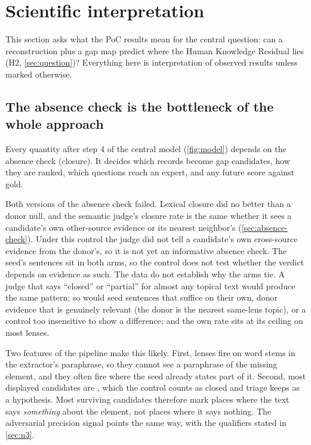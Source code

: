 \section{Scientific interpretation}\label{sec:interpretation}

This section asks what the PoC results mean for the central question: can a reconstruction plus a
gap map predict where the Human Knowledge Residual lies (H2, \cref{sec:question})? Everything here
is interpretation of observed results unless marked otherwise.

\subsection{The absence check is the bottleneck of the whole approach}\label{sec:interp-bottleneck}

Every quantity after step 4 of the central model (\cref{fig:model}) depends on the absence check
(closure). It decides which records become gap candidates, how they are ranked, which questions reach
an expert, and any future score against gold.

\evobs{} Both versions of the absence check failed. Lexical closure did no better than a donor null,
and the semantic judge's closure rate is the same whether it sees a candidate's own other-source
evidence or its nearest neighbor's (\cref{sec:absence-check}). Under this control the
judge did not tell a candidate's own cross-source evidence from the donor's, so it is not yet an
informative absence check. The seed's sentences sit in both arms, so the control does not test
whether the verdict depends on evidence as such. The data do not establish why the arms tie. A judge
that says \enquote{closed} or \enquote{partial} for almost any topical text would produce the same
pattern; so would seed sentences that suffice on their own, donor evidence that is genuinely relevant
(the donor is the nearest same-lens topic), or a control too insensitive to show a difference; and
the own rate sits at its ceiling on most lenses.

\evint{} Two features of the pipeline make this likely. First, lenses fire on word stems in the
extractor's paraphrase, so they cannot see a paraphrase of the missing element, and they often fire
where the seed already states part of it. Second, most displayed candidates are ,
which the control counts as closed and triage keeps as a hypothesis. Most surviving candidates
therefore mark places where the text says \emph{something} about the element, not places where it
says nothing. The adversarial precision signal points the same way, with the qualifiers stated in
\cref{sec:n3}.

